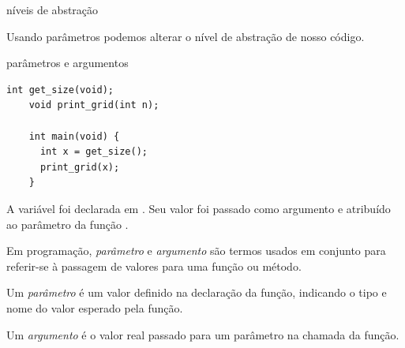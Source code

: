 \documentclass{beamer}
\begin{document}
\begin{frame}{níveis de abstração}

  

  \framebreak

  Usando parâmetros podemos alterar o nível de abstração de nosso
  código.

  

\end{frame}  


\begin{frame}{parâmetros e argumentos}

  \begin{lstlisting}[style=normalc,caption=mario.c]
    int get_size(void);
    void print_grid(int n);
    
    int main(void) {
      int x = get_size();
      print_grid(x);
    }
  \end{lstlisting}

  A variável  foi declarada em . Seu valor foi
  passado como argumento e atribuído ao parâmetro  da função
  .

  \framebreak

  Em programação, \emph{parâmetro} e \emph{argumento} são termos
  usados em conjunto para referir-se à passagem de valores para uma
  função ou método.

  Um \emph{parâmetro} é um valor definido na declaração da função,
  indicando o tipo e nome do valor esperado pela função.

  Um \emph{argumento} é o valor real passado para um parâmetro na chamada
  da função.
  
\end{frame}
\end{document}
